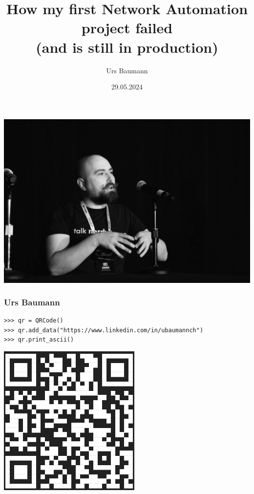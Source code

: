 \documentclass[aspectratio=169]{beamer}
\title[How my first Network Automation project failed (and is still in production)]{How my first Network Automation project failed \\ (and is still in production)}
\author{Urs Baumann}
\institute{Swisscom}
\date{29.05.2024}
\begin{document}
{
{
  \includegraphics[height=\paperheight]{images/AutoCon_0-108.jpg}
}
\frame{\titlepage}
}


\begin{frame}[fragile]
  \frametitle{Urs Baumann}

  \begin{verbatim}
>>> qr = QRCode()
>>> qr.add_data("https://www.linkedin.com/in/ubaumannch")
>>> qr.print_ascii()
  \end{verbatim}

  \includegraphics[height = 0.6\textheight]{images/qrcode.png}

\end{frame}
\end{document}
